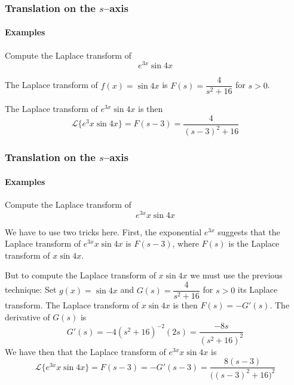 \documentclass[9pt,xcolor=x11names,compress]{beamer}
\newcommand*\Laplace[1]{\mathcal{L}\{{#1}\}}
\begin{document}
\begin{frame}\frametitle{Translation on the $s$--axis}
\framesubtitle{Examples}
\begin{block}
	{Compute the Laplace transform of}
	\begin{equation*}
		e^{3x}\sin 4x
	\end{equation*}
\end{block}
\pause The Laplace transform of $f(x)=\sin 4x$ is $F(s)=\dfrac{4}{s^2+16}$ for $s>0$.

\pause The Laplace transform of $e^{3x}\sin 4x$ is then 
\begin{equation*}
	\Laplace{e^3x\sin 4x}=F(s-3)=\frac{4}{(s-3)^2+16}	
\end{equation*}

\vspace{3cm}
\end{frame}

\begin{frame}\frametitle{Translation on the $s$--axis}
\framesubtitle{Examples}
\begin{block}
	{Compute the Laplace transform of}
	\begin{equation*}
		e^{3x}x\sin 4x
	\end{equation*}
\end{block}
We have to use two tricks here.  First, the exponential $e^{3x}$ suggests that the Laplace transform of $e^{3x}x\sin 4x$ is $F(s-3)$, where $F(s)$ is the Laplace transform of $x\sin 4x$.  

\pause But to compute the Laplace transform of $x\sin 4x$ we must use the previous technique:  Set $g(x)=\sin 4x$ and $G(s)=\dfrac{4}{s^2+16}$ for $s>0$ its Laplace transform.  The Laplace transform of $x\sin 4x$ is then $F(s)=-G'(s)$.
\pause The derivative of $G(s)$ is
\begin{equation*}
	G'(s)=-4(s^2+16)^{-2}(2s)=\frac{-8s}{(s^2+16)^2}
\end{equation*}
We have then that the Laplace transform of $e^{3x}x\sin 4x$ is
\begin{equation*}
	\Laplace{e^{3x}x\sin 4x} = F(s-3) = -G'(s-3) = \frac{8(s-3)}{\big( (s-3)^2+16\big)^2}
\end{equation*}
\end{frame}
\end{document}
